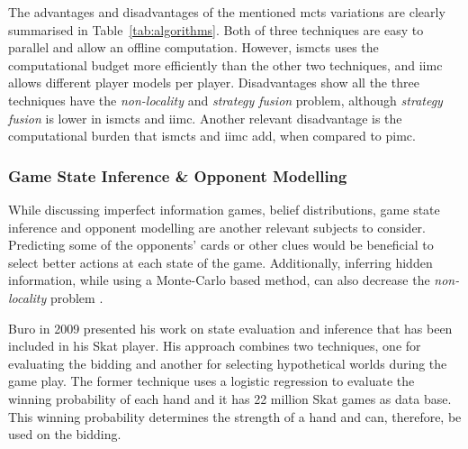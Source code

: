 The advantages and disadvantages of the mentioned \ac{mcts} variations are clearly summarised in Table~\ref{tab:algorithms}.
Both of three techniques are easy to parallel and allow an offline computation. However, \ac{ismcts} uses the computational budget more efficiently than the other two techniques, and \ac{iimc} allows different player models per player.
Disadvantages show all the three techniques have the \emph{non-locality} and \emph{strategy fusion} problem, although \emph{strategy fusion} is lower in \ac{ismcts} and \ac{iimc}.
Another relevant disadvantage is the computational burden that \ac{ismcts} and \ac{iimc} add, when compared to \ac{pimc}.







\subsubsection{Game State Inference \& Opponent Modelling}


While discussing imperfect information games, belief distributions, game state inference and opponent modelling are another relevant subjects to consider.
Predicting some of the opponents' cards or other clues would be beneficial to select better actions at each state of the game. Additionally, inferring hidden information, while using a Monte-Carlo based method, can also decrease the \emph{non-locality} problem \cite{Cowling2012}.


Buro in 2009 \cite{Buro} presented his work on state evaluation and inference that has been included in his Skat player.
His approach combines two techniques, one for evaluating the bidding and another for selecting hypothetical worlds during the game play.
The former technique uses a logistic regression to evaluate the winning probability of each hand and it has 22 million Skat games as data base.
This winning probability determines the strength of a hand and can, therefore, be used on the bidding.


